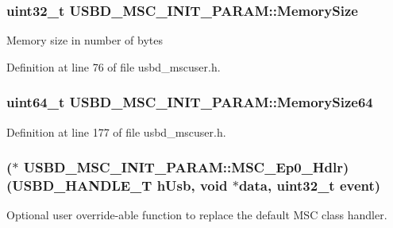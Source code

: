 \subsubsection[{\texorpdfstring{Memory\+Size}{MemorySize}}]{\setlength{\rightskip}{0pt plus 5cm}uint32\+\_\+t U\+S\+B\+D\+\_\+\+M\+S\+C\+\_\+\+I\+N\+I\+T\+\_\+\+P\+A\+R\+A\+M\+::\+Memory\+Size}\hypertarget{structUSBD__MSC__INIT__PARAM_af5cecd156943a33ccaa619ea8a9d596d}{}\label{structUSBD__MSC__INIT__PARAM_af5cecd156943a33ccaa619ea8a9d596d}
Memory size in number of bytes 

Definition at line 76 of file usbd\+\_\+mscuser.\+h.

\subsubsection[{\texorpdfstring{Memory\+Size64}{MemorySize64}}]{\setlength{\rightskip}{0pt plus 5cm}uint64\+\_\+t U\+S\+B\+D\+\_\+\+M\+S\+C\+\_\+\+I\+N\+I\+T\+\_\+\+P\+A\+R\+A\+M\+::\+Memory\+Size64}\hypertarget{structUSBD__MSC__INIT__PARAM_abca96b7a6d9b77020bdca1ffdd153e56}{}\label{structUSBD__MSC__INIT__PARAM_abca96b7a6d9b77020bdca1ffdd153e56}


Definition at line 177 of file usbd\+\_\+mscuser.\+h.

\subsubsection[{\texorpdfstring{M\+S\+C\+\_\+\+Ep0\+\_\+\+Hdlr}{MSC_Ep0_Hdlr}}]{($\ast$ U\+S\+B\+D\+\_\+\+M\+S\+C\+\_\+\+I\+N\+I\+T\+\_\+\+P\+A\+R\+A\+M\+::\+M\+S\+C\+\_\+\+Ep0\+\_\+\+Hdlr) ({\bf U\+S\+B\+D\+\_\+\+H\+A\+N\+D\+L\+E\+\_\+T} h\+Usb, void $\ast$data, uint32\+\_\+t event)}\hypertarget{structUSBD__MSC__INIT__PARAM_a9d79a4a1054e7ecb88c7a2b51aa3d4c8}{}\label{structUSBD__MSC__INIT__PARAM_a9d79a4a1054e7ecb88c7a2b51aa3d4c8}
Optional user override-\/able function to replace the default M\+SC class handler.

